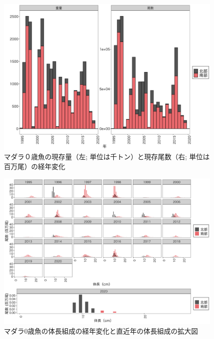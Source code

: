 \documentclass[11pt]{article} %
\begin{document}
\begin{linenumbers}
\begin{figure}[h]
  \centering
  \includegraphics[width = 14cm]{マダラ０＋trend.png}
  \caption{マダラ０歳魚の現存量（左; 単位は千トン）と現存尾数（右; 単位は百万尾）の経年変化}
\end{figure}

\begin{figure}[h]
  \centering
  \includegraphics[width = 14cm]{マダラ0+length.png}
  \caption{マダラ0歳魚の体長組成の経年変化と直近年の体長組成の拡大図}
\end{figure}


\end{linenumbers}
\end{document}
